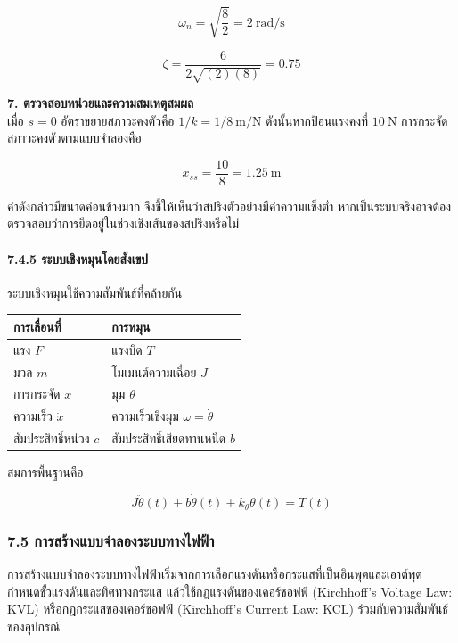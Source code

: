 \[
\omega_n=\sqrt{\frac{8}{2}}=2\ \text{rad/s}
\]

\[
\zeta=\frac{6}{2\sqrt{(2)(8)}}=0.75
\]

\textbf{7. ตรวจสอบหน่วยและความสมเหตุสมผล}\\เมื่อ $s=0$ อัตราขยายสภาวะคงตัวคือ $1/k=1/8\ \text{m/N}$ ดังนั้นหากป้อนแรงคงที่ $10\ \text{N}$ การกระจัดสภาวะคงตัวตามแบบจำลองคือ

\[
x_{ss}=\frac{10}{8}=1.25\ \text{m}
\]

ค่าดังกล่าวมีขนาดค่อนข้างมาก จึงชี้ให้เห็นว่าสปริงตัวอย่างมีค่าความแข็งต่ำ หากเป็นระบบจริงอาจต้องตรวจสอบว่าการยืดอยู่ในช่วงเชิงเส้นของสปริงหรือไม่

\paragraph{7.4.5 ระบบเชิงหมุนโดยสังเขป}

ระบบเชิงหมุนใช้ความสัมพันธ์ที่คล้ายกัน

\begin{table}[htbp]
    \centering
    \begin{tabular}{l l}
        \hline
        \textbf{การเลื่อนที่} & \textbf{การหมุน} \\
        \hline
        แรง $F$ & แรงบิด $T$ \\
        มวล $m$ & โมเมนต์ความเฉื่อย $J$ \\
        การกระจัด $x$ & มุม $\theta$ \\
        ความเร็ว $\dot{x}$ & ความเร็วเชิงมุม $\omega=\dot{\theta}$ \\
        สัมประสิทธิ์หน่วง $c$ & สัมประสิทธิ์เสียดทานหนืด $b$ \\
        \hline
    \end{tabular}
\end{table}

สมการพื้นฐานคือ

\[
J\ddot{\theta}(t)+b\dot{\theta}(t)+k_\theta\theta(t)=T(t)
\]

\subsubsection{7.5 การสร้างแบบจำลองระบบทางไฟฟ้า}

การสร้างแบบจำลองระบบทางไฟฟ้าเริ่มจากการเลือกแรงดันหรือกระแสที่เป็นอินพุตและเอาต์พุต กำหนดขั้วแรงดันและทิศทางกระแส แล้วใช้กฎแรงดันของเคอร์ชอฟฟ์ (Kirchhoff’s Voltage Law: KVL) หรือกฎกระแสของเคอร์ชอฟฟ์ (Kirchhoff’s Current Law: KCL) ร่วมกับความสัมพันธ์ของอุปกรณ์

